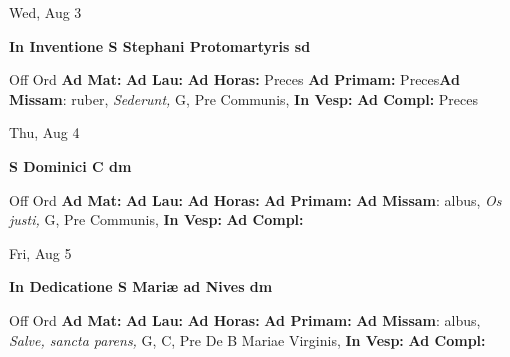 \documentclass[10pt]{book}
\begin{document}
\begin{center}
\begin{minipage}{3.5in}
\vspace{2em}
\begin{center}Wed, Aug 3
\end{center}
\textbf{ \large In Inventione S Stephani Protomartyris
\textnormal{\normalsize sd}}

\begin{justify}Off Ord
\textbf{Ad Mat: }
\textbf{Ad Lau: }
\textbf{Ad Horas: }Preces
\textbf{Ad Primam: }Preces\textbf{Ad Missam}: ruber, \textit{Sederunt,} G, Pre Communis, 
\textbf{In Vesp: }
\textbf{Ad Compl: }Preces
\end{justify}
\end{minipage}
\end{center}

\begin{center}
\begin{minipage}{3.5in}
\vspace{2em}
\begin{center}Thu, Aug 4
\end{center}
\textbf{ \large S Dominici C
\textnormal{\normalsize dm}}

\begin{justify}Off Ord
\textbf{Ad Mat: }
\textbf{Ad Lau: }
\textbf{Ad Horas: }
\textbf{Ad Primam: }\textbf{Ad Missam}: albus, \textit{Os justi,} G, Pre Communis, 
\textbf{In Vesp: }
\textbf{Ad Compl: }
\end{justify}
\end{minipage}
\end{center}

\begin{center}
\begin{minipage}{3.5in}
\vspace{2em}
\begin{center}Fri, Aug 5
\end{center}
\textbf{ \large In Dedicatione S Mariæ ad Nives
\textnormal{\normalsize dm}}

\begin{justify}Off Ord
\textbf{Ad Mat: }
\textbf{Ad Lau: }
\textbf{Ad Horas: }
\textbf{Ad Primam: }\textbf{Ad Missam}: albus, \textit{Salve, sancta parens,} G, C, Pre De B Mariae Virginis, 
\textbf{In Vesp: }
\textbf{Ad Compl: }
\end{justify}
\end{minipage}
\end{center}
\end{document}
